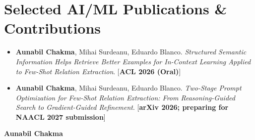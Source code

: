 \documentclass[11pt]{extarticle}
\begin{document}
\section*{Selected AI/ML Publications \& Contributions}
\begin{itemize}
  \item {\normalsize \textbf{Aunabil Chakma}, Mihai Surdeanu, Eduardo Blanco. \textit{Structured Semantic Information Helps Retrieve Better Examples for In-Context Learning Applied to Few-Shot Relation Extraction}. [\textbf{ACL 2026 (Oral)}]}
  \item {\normalsize \textbf{Aunabil Chakma}, Mihai Surdeanu, Eduardo Blanco. \textit{Two-Stage Prompt Optimization for Few-Shot Relation Extraction: From Reasoning-Guided Search to Gradient-Guided Refinement}. [\textbf{arXiv 2026; preparing for NAACL 2027 submission}]}
\end{itemize}

\newpage
\begin{center}
  \textbf{Aunabil Chakma}
\end{center}
\vspace{-1.1em}
\end{document}
